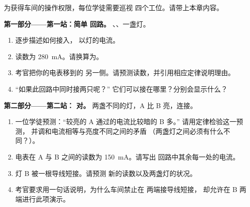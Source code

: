 \begin{problem}\label{pb:g8:intensity-ammeter:1}
为获得车间的操作权限，每位学徒需要巡视
四个工位。请带上本章内容。

\medskip\noindent\textbf{第一部分——第一站：简单
回路。}
、、一盏灯。
\begin{enumerate}
  \item 逐步描述如何接入，
        以灯的电流。
  \item 读数为 \qty{280}{mA}。请换算为。
  \item 考官把你的电表移到的
        另一侧。请预测读数，并引用相应定律说明理由。
  \item “如果此回路中同时接两只呢？”
        它们可以接在哪里？分别会显示什么？
\end{enumerate}

\medskip\noindent\textbf{第二部分——第二站：
对。}
两盏不同的灯，A 比 B 亮，连接。
\begin{enumerate}[resume]
  \item 一位学徒预测：“较亮的 A 通过的电流比较暗的 B 多。”
        请用定律检验这一预测，
        并调和电流相等与亮度不同之间的矛盾
        （两盏灯之间必须有什么不同？）。
  \item 电表在 A 与 B 之间的读数为 \qty{150}{mA}。请写出
        回路中其余每一处的电流。
  \item 灯 B 被一根导线短接。请预测
        新的读数以及两盏灯的状况。
  \item 考官要求用一句话说明，为什么车间禁止在
        \emph{}两端接导线短接，
        却允许在 B 两端进行此项演示。
\end{enumerate}


\end{problem}
